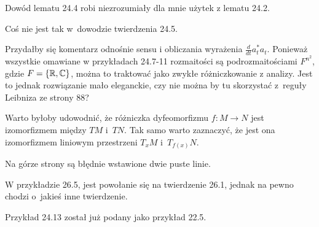 \documentclass[a4paper,11pt]{article}
\begin{document}
\noindent
{} Dowód lematu 24.4 robi niezrozumiały dla mnie użytek
z lematu 24.2.

\vspace{\spaceFour}





\noindent
{} Coś nie jest tak w~dowodzie twierdzenia 24.5.

\vspace{\spaceFour}





\noindent
{} Przydałby się komentarz odnośnie sensu i obliczania
wyrażenia $\frac{ d }{ dt } a^{ * }_{ t } a_{ t }$. Ponieważ wszystkie
omawiane w przykładach 24.7-11 rozmaitości są podrozmaitościami
$F^{ n^{ 2 } }$, gdzie $F = \{ \mathbb{R}, \mathbb{C} \}$, można
to traktować jako zwykłe różniczkowanie z analizy. Jest to jednak
rozwiązanie mało eleganckie, czy nie można by tu skorzystać z~reguły
Leibniza ze strony 88?

\vspace{\spaceFour}





\noindent
Warto byłoby udowodnić, że różniczka dyfeomorfizmu
$f : M \to N$ jest izomorfizmem między $TM$ i~$TN$. Tak samo warto
zaznaczyć, że jest ona izomorfizmem liniowym przestrzeni $T_{ x }M$
i~$T_{ f( x ) }N$.

\vspace{\spaceFour}





\noindent
{} Na górze strony są błędnie wstawione dwie puste linie.

\vspace{\spaceFour}





\noindent
{} W przykładzie 26.5, jest powołanie się na twierdzenie
26.1, jednak na pewno chodzi o~jakieś inne twierdzenie.

\vspace{\spaceFour}





\noindent
{} Przykład 24.13 został już podany jako przykład 22.5.

\vspace{\spaceFour}
\end{document}
